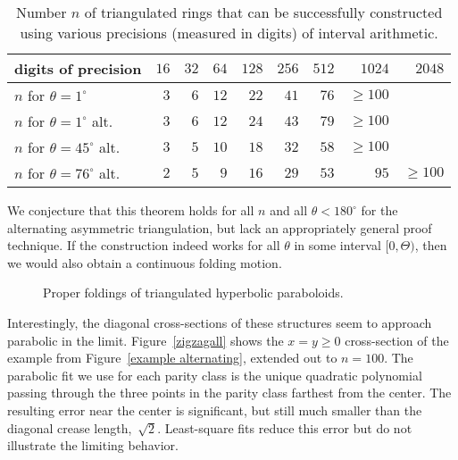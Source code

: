 \documentclass[11pt,letterpaper]{article}
\begin{document}
\begin{table}
  \centering
  \begin{tabular}{l|rrrrrrrr}
    digits of precision & $16$ & $32$ & $64$ & $128$ & $256$ & $512$ & $1024$ & $2048$
    \\ \hline
    $n$ for $\theta=1^\circ$ &  $3$ &  $6$ & $12$ &  $22$ &  $41$ &  $76$ & $\geq 100$
    \\
    $n$ for $\theta=1^\circ$ alt.&  $3$ &  $6$ & $12$ &  $24$ &  $43$ &  $79$ & $\geq 100$
    \\
    $n$ for $\theta=45^\circ$ alt.&  $3$ &  $5$ & $10$ &  $18$ &  $32$ &  $58$ & $\geq 100$
    \\
    $n$ for $\theta=76^\circ$ alt.&  $2$ &  $5$ &  $9$ &  $16$ &  $29$ &  $53$ & $95$ & $\geq 100$
  \end{tabular}
  \caption{Number $n$ of triangulated rings that can be successfully
    constructed using various precisions (measured in digits) of interval
    arithmetic.}
  \label{precision}
\end{table}

We conjecture that this theorem holds for all $n$ and all
$\theta < 180^\circ$ for the alternating asymmetric triangulation,
but lack an appropriately general proof technique.
If the construction indeed works for all $\theta$ in some interval
$[0,\Theta)$, then we would also obtain a continuous folding motion.

\begin{figure}
  \centering
  \hfil
  \caption{Proper foldings of triangulated hyperbolic paraboloids.}
  \label{triangulated hypar}
\end{figure}

Interestingly, the diagonal cross-sections of these structures seem to
approach parabolic in the limit.  Figure~\ref{zigzagall} shows the
$x = y \geq 0$ cross-section of the example from
Figure~\ref{example alternating}, extended out to $n=100$.
The parabolic fit we use for each parity class is the unique quadratic
polynomial passing through the three points in the parity class farthest
from the center.  The resulting error near the center is significant, but
still much smaller than the diagonal crease length,~$\sqrt 2$.
Least-square fits reduce this error
but do not illustrate the limiting behavior.
\end{document}

